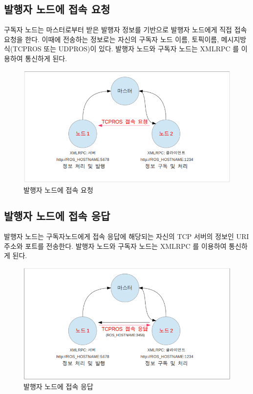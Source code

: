 \subsection{발행자 노드에 접속 요청}

구독자 노드는 마스터로부터 받은 발행자 정보를 기반으로 발행자 노드에게 직접 접속 요청을 한다. 이때에 전송하는 정보로는 자신의 구독자 노드 이름, 토픽이름, 메시지방식(TCPROS 또는 UDPROS)이 있다. 발행자 노드와 구독자 노드는 XMLRPC 를 이용하여 통신하게 된다.

\begin{figure}[h]
\centering\includegraphics[width=0.6\columnwidth]{pictures/chapter4/notion5.png}
\caption{발행자 노드에 접속 요청}
\end{figure}

\subsection{발행자 노드에 접속 응답}

발행자 노드는 구독자노드에게 접속 응답에 해당되는 자신의 TCP 서버의 정보인 URI주소와 포트를 전송한다. 발행자 노드와 구독자 노드는 XMLRPC 를 이용하여 통신하게 된다.

\begin{figure}[h]
\centering\includegraphics[width=0.6\columnwidth]{pictures/chapter4/notion6.png}
\caption{발행자 노드에 접속 응답}
\end{figure}


